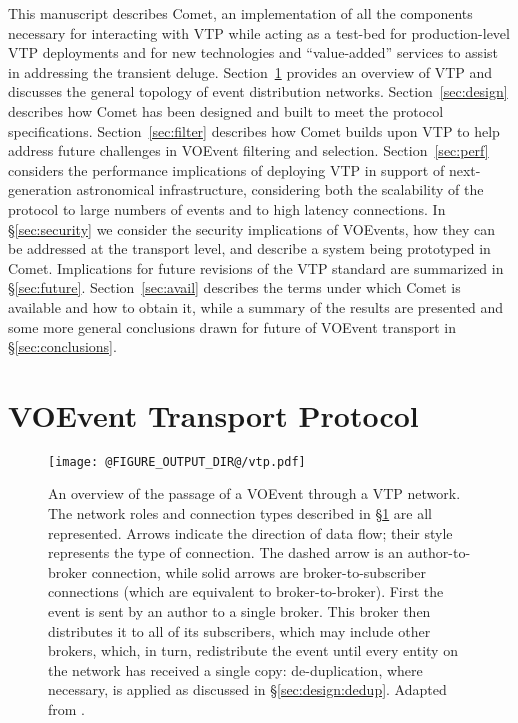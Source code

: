\documentclass[5p,authoryear]{elsarticle}
\begin{document}
This manuscript describes Comet, an implementation of all the components
necessary for interacting with VTP while acting as a test-bed for
production-level VTP deployments and for new technologies and ``value-added''
services to assist in addressing the transient deluge. Section~\ref{sec:vtp}
provides an overview of VTP and discusses the general topology of event
distribution networks. Section~\ref{sec:design} describes how Comet has been
designed and built to meet the protocol specifications.
Section~\ref{sec:filter} describes how Comet builds upon VTP to help address
future challenges in VOEvent filtering and selection. Section~\ref{sec:perf}
considers the performance implications of deploying VTP in support of
next-generation astronomical infrastructure, considering both the scalability
of the protocol to large numbers of events and to high latency connections. In
\S\ref{sec:security} we consider the security implications of VOEvents, how
they can be addressed at the transport level, and describe a system being
prototyped in Comet.  Implications for future revisions of the VTP standard
are summarized in \S\ref{sec:future}. Section~\ref{sec:avail} describes the
terms under which Comet is available and how to obtain it, while a summary of
the results are presented and some more general conclusions drawn for future
of VOEvent transport in \S\ref{sec:conclusions}.

\section{VOEvent Transport Protocol}
\label{sec:vtp}

\begin{figure}
  \begin{center}
  \texttt{[image: @FIGURE\_OUTPUT\_DIR@/vtp.pdf]}
  \end{center}

  \caption{An overview of the passage of a VOEvent through a VTP network. The
  network roles and connection types described in \S\ref{sec:vtp} are all
  represented. Arrows indicate the direction of data flow; their style
  represents the type of connection. The dashed arrow is an author-to-broker
  connection, while solid arrows are broker-to-subscriber connections
  (which are equivalent to broker-to-broker). First the event is sent by an
  author to a single broker. This broker then distributes it to all of its
  subscribers, which may include other brokers, which, in turn, redistribute
  the event until every entity on the network has received a single copy:
  de-duplication, where necessary, is applied as discussed in
  \S\ref{sec:design:dedup}. Adapted from \citet{Swinbank:2014}.}

  \label{fig:vtp}
\end{figure}
\end{document}
